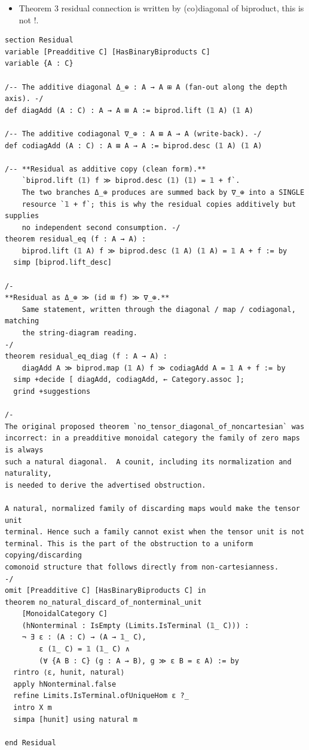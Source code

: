 \documentclass[a4paper,11pt]{article}
\begin{document}
\begin{itemize}
\item
  Theorem 3 residual connection is written by (co)diagonal of biproduct, this is not !.
\end{itemize}

\begin{lstlisting}
section Residual
variable [Preadditive C] [HasBinaryBiproducts C]
variable {A : C}

/-- The additive diagonal Δ_⊕ : A → A ⊞ A (fan-out along the depth axis). -/
def diagAdd (A : C) : A → A ⊞ A := biprod.lift (𝟙 A) (𝟙 A)

/-- The additive codiagonal ∇_⊕ : A ⊞ A → A (write-back). -/
def codiagAdd (A : C) : A ⊞ A → A := biprod.desc (𝟙 A) (𝟙 A)

/-- **Residual as additive copy (clean form).**
    `biprod.lift (𝟙) f ≫ biprod.desc (𝟙) (𝟙) = 𝟙 + f`.
    The two branches Δ_⊕ produces are summed back by ∇_⊕ into a SINGLE
    resource `𝟙 + f`; this is why the residual copies additively but supplies
    no independent second consumption. -/
theorem residual_eq (f : A → A) :
    biprod.lift (𝟙 A) f ≫ biprod.desc (𝟙 A) (𝟙 A) = 𝟙 A + f := by
  simp [biprod.lift_desc]

/-
**Residual as Δ_⊕ ≫ (id ⊞ f) ≫ ∇_⊕.**
    Same statement, written through the diagonal / map / codiagonal, matching
    the string-diagram reading.
-/
theorem residual_eq_diag (f : A → A) :
    diagAdd A ≫ biprod.map (𝟙 A) f ≫ codiagAdd A = 𝟙 A + f := by
  simp +decide [ diagAdd, codiagAdd, ← Category.assoc ];
  grind +suggestions

/-
The original proposed theorem `no_tensor_diagonal_of_noncartesian` was
incorrect: in a preadditive monoidal category the family of zero maps is always
such a natural diagonal.  A counit, including its normalization and naturality,
is needed to derive the advertised obstruction.

A natural, normalized family of discarding maps would make the tensor unit
terminal. Hence such a family cannot exist when the tensor unit is not
terminal. This is the part of the obstruction to a uniform copying/discarding
comonoid structure that follows directly from non-cartesianness.
-/
omit [Preadditive C] [HasBinaryBiproducts C] in
theorem no_natural_discard_of_nonterminal_unit
    [MonoidalCategory C]
    (hNonterminal : IsEmpty (Limits.IsTerminal (𝟙_ C))) :
    ¬ ∃ ε : (A : C) → (A → 𝟙_ C),
        ε (𝟙_ C) = 𝟙 (𝟙_ C) ∧
        (∀ {A B : C} (g : A → B), g ≫ ε B = ε A) := by
  rintro ⟨ε, hunit, natural⟩
  apply hNonterminal.false
  refine Limits.IsTerminal.ofUniqueHom ε ?_
  intro X m
  simpa [hunit] using natural m

end Residual
\end{lstlisting}
\end{document}
